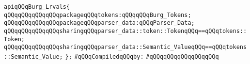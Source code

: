 \verb|apiqQQqBurg_Lrvals{|\newline
\verb|qQQqqQQqqQQqqQQqpackageqQQqtokens:qQQqqQQqBurg_Tokens;|\newline
\verb|qQQqqQQqqQQqqQQqpackageqQQqparser_data:qQQqParser_Data;|\newline
\verb|qQQqqQQqqQQqqQQqsharingqQQqparser_data::token::TokenqQQq==qQQqtokens::Token;|\newline
\verb|qQQqqQQqqQQqqQQqsharingqQQqparser_data::Semantic_ValueqQQq==qQQqtokens::Semantic_Value;|\newline
\verb|};|\newline
\newline
\verb|#qQQqCompiledqQQqby:|\newline
\verb|#qQQqqQQqqQQqqQQqqQQq|\newline
\newline


